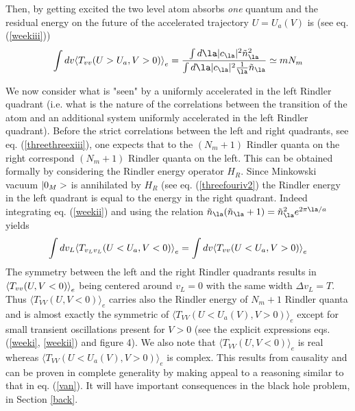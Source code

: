 Then, by getting excited the two level atom absorbs {\it one} quantum
and
the residual energy on the future of the accelerated trajectory $U=U_a(V)$
 is (see eq. (\ref{weekiii}))
\begin{equation}
 \int dv \bk{T_{vv}(U>U_a, V>0 )}_{e} = { \int d \la
\vert c_\la
\vert^2 \tilde n_\la^2  \over \int d \la \vert c_\la
\vert^2 {1 \over \la} \tilde n_\la }
\simeq m N_m
\end{equation}

We now consider what is "seen" by a uniformly accelerated in the
left Rindler quadrant (i.e. what is the nature
of the correlations between the
transition of the atom and an additional  system
uniformly accelerated in the
left Rindler quadrant).
Before the strict correlations between the left and right quadrants, see eq.
(\ref{threethreexiii}), one expects that to the $(N_m+1)$ Rindler quanta
on the right correspond $(N_m+1)$ Rindler quanta
on the left. This can be obtained formally by considering
the Rindler energy operator $H_R$. Since Minkowski vacuum $\mbox{$ \vert 0_M > $}$ is
annihilated by $H_R$ (see
eq. (\ref{threefouriv2})
the Rindler energy in the
left quadrant is equal to the energy in the right quadrant.
Indeed integrating eq. (\ref{weekii}) and using the
relation $\tilde n_\la ( \tilde n_\la + 1) =
\tilde n_\la^2 e^{2\pi \la /a}$
yields
\begin{equation}
\int dv_L \mbox{$ \langle T_{v_Lv_L}(U<U_a, V<0 ) \rangle $}_{e}
= \int dv \mbox{$ \langle T_{vv}(U<U_a, V>0 ) \rangle $}_{e}
\label{twos}
\end{equation}
The symmetry between the left and the right Rindler quadrants results in
$\mbox{$ \langle T_{vv}(U, V<0 ) \rangle $}_{e}$ being centered around $v_L=0$ with the same width
$\Delta v_L=T$.
Thus $\langle T_{VV} (U,V<0) \rangle_e$ carries also the Rindler
energy of $N_m + 1$
Rindler quanta and is almost exactly the symmetric of
$\langle T_{VV} (U<U_a(V),V>0) \rangle_e$ except for small transient
oscillations present for $V>0$
(see the explicit expressions eqs. (\ref{weeki},
\ref{weekii}) and figure 4). We also note that $\langle T_{VV} (U,V<0)
\rangle_e$ is real whereas $\langle T_{VV} (U<U_a(V),V>0) \rangle_e$ is
complex. This results from causality and can be proven in complete generality
by making appeal to a reasoning similar to that in eq. (\ref{van}). It will
have important consequences in the black hole problem, in Section \ref{back}.

